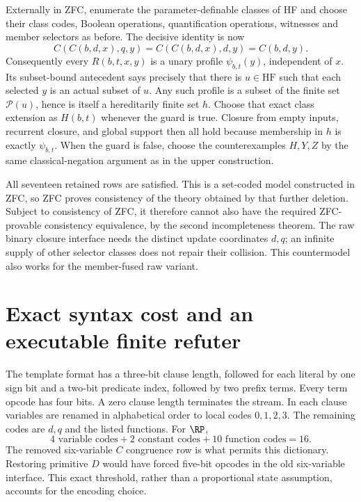 Externally in ZFC, enumerate the parameter-definable classes of HF and
choose their class codes, Boolean operations, quantification operations,
witnesses and member selectors as before. The decisive identity is now
\[
 C(C(b,d,x),q,y)=C(C(b,d,x),d,y)=C(b,d,y).
\]
Consequently every $R(b,t,x,y)$ is a unary profile $\psi_{b,t}(y)$,
independent of $x$. Its subset-bound antecedent says precisely that
there is $u\in\mathrm{HF}$ such that each selected $y$ is an actual
subset of $u$. Any such profile is a subset of the finite set
$\mathcal P(u)$, hence is itself a hereditarily finite set $h$.
Choose that exact class extension as $H(b,t)$ whenever the guard is
true. Closure from empty inputs, recurrent closure, and global support
then all hold because membership in $h$ is exactly $\psi_{b,t}$.
When the guard is false, choose the counterexamples $H,Y,Z$ by the
same classical-negation argument as in the upper construction.

All seventeen retained rows are satisfied. This is a set-coded model
constructed in ZFC, so ZFC proves consistency of the theory obtained
by that further deletion. Subject to consistency of ZFC, it therefore
cannot also have the required ZFC-provable consistency equivalence,
by the second incompleteness theorem. The raw binary closure interface
needs the distinct update coordinates $d,q$; an infinite supply of other
selector classes does not repair their collision. This countermodel
also works for the member-fused raw variant.

\section{Exact syntax cost and an executable finite refuter}

The template format has a three-bit clause length, followed for each
literal by one sign bit and a two-bit predicate index, followed by two
prefix terms. Every term opcode has four bits. A zero clause length
terminates the stream. In each clause variables are renamed in alphabetical
order to local codes $0,1,2,3$. The remaining codes are $d,q$ and the
listed functions. For $\RP$,
\[
 4\text{ variable codes}+2\text{ constant codes}+10\text{ function codes}=16.
\]
The removed six-variable $C$ congruence row is what permits this dictionary.
Restoring primitive $D$ would have forced five-bit opcodes in the old
six-variable interface. This exact threshold, rather than a proportional
state assumption, accounts for the encoding choice.

